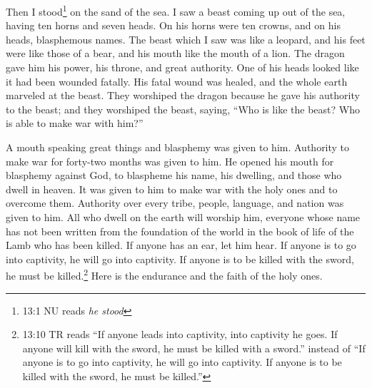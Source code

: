 \mychapter{} \myverse*{}Then I stood\footnote{13:1 NU reads \textit{he stood}} on the sand of the sea. I saw a beast coming up out of the sea, having ten
horns and seven heads. On his horns were ten crowns, and on his heads, blasphemous names.
\myverse{}The beast which I saw was like a leopard, and his feet were like those of a
bear, and his mouth like the mouth of a lion. The dragon gave him his power, his throne, and great authority.
\myverse{}One of his heads looked like it had been wounded fatally. His fatal wound was
healed, and the whole earth marveled at the beast.
\myverse{}They worshiped the dragon because he gave his authority to the beast; and they
worshiped the beast, saying, “Who is like the beast? Who is able to make war with him?”

\myverse{}A mouth speaking great things and blasphemy was given to him.
Authority to make war for forty-two months was given to him.
\myverse{}He opened his mouth for blasphemy against God, to blaspheme his name, his dwelling,
and those who dwell in heaven.
\myverse{}It was given to him to make war with the holy ones and to overcome them. Authority
over every tribe, people, language, and nation was given to him.
\myverse{}All who dwell on the earth will worship him, everyone whose name has not been
written from the foundation of the world in the book of life of the Lamb who has been killed.
\myverse{}If anyone has an ear, let him hear.
\myverse{}If anyone is to go into captivity, he will go into captivity. If anyone is
to be killed with the sword, he must be killed.\footnote{13:10 TR reads “If anyone leads into captivity, into captivity he goes. If anyone will kill with the
	sword, he must be killed with a sword.” instead of “If anyone is to go into captivity, he will go into
	captivity. If anyone is to be killed with the sword, he must be killed.”
} Here is the endurance and the faith of the holy ones.

